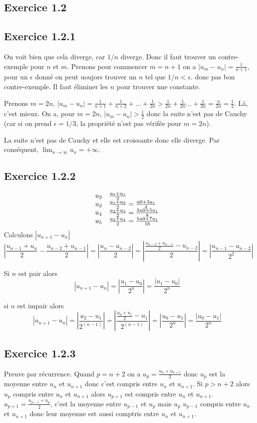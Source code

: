 \documentclass[]{book}
\theoremstyle{definition}
\begin{document}
\subsection*{Exercice 1.2}
\subsection*{Exercice 1.2.1}
On voit bien que cela diverge, car $1/n$ diverge. Donc il faut trouver un contre-exemple pour $n$ et $m$.
Prenons pour commencer $m=n+1$ on a $|u_m-u_n| = \frac{1}{n+1}$, pour un $\epsilon$ donn\'e on peut uoujors trouver un $n$ tel que $1/n < \epsilon$. donc pas bon contre-exemple. Il faut \'eliminer les $n$ pour trouver une constante.

Prenons $m=2n$, $|u_m-u_n| = \frac{1}{n+1} + \frac{1}{n+2} + \ldots + \frac{1}{2n} > \frac{1}{2n} + \frac{1}{2n} \ldots + \frac{1}{2n} = \frac{n}{2n} = \frac{1}{2}$. L\`a, c'est mieux. On a, pour $m=2n$, $|u_m-u_n| > \frac{1}{2}$ donc la suite n'est pas de Cauchy (car si on prend $\epsilon = 1/3$, la propri\'et\'e n'est pas v\'erif\'ee pour $m=2n$).

La suite n'est pas de Cauchy et elle est croissante donc elle diverge. Par cons\'equent, $\lim_{n \to \infty} u_n = +\infty$.

\subsection*{Exercice 1.2.2}
$$
\begin{array}{l l}
u_2 & \frac{u_0+u_1}{2} \\
u_3 & \frac{u_1+u_2}{2} = \frac{u0+3u_1}{4}\\
u_4 & \frac{u_2+u_3}{2} = \frac{3u0+5u_1}{8}\\
u_5 & \frac{u_3+u_4}{2} = \frac{5u0+7u_1}{16}\\
\end{array}
$$
Calculons $|u_{n+1} - u_{n}|$
$$
|\frac{u_{n-1}+u_{n}}{2} - \frac{u_{n-2}+u_{n-1}}{2}| = |\frac{u_{n}-u_{n-2}}{2}| = |\frac{\frac{u_{n-2}+u_{n-1}}{2}-u_{n-2}}{2}| = |\frac{u_{n-1}-u_{n-2}}{2^2}|
$$ 

Si $n$ est pair alors 
$$|u_{n+1} - u_{n}| = |\frac{u_1 - u_0}{2^n}| = \frac{|u_1 - u_0|}{2^n}$$ 

si $n$ est impair alors
$$|u_{n+1} - u_{n}| = |\frac{u_2 - u_1}{2^(n-1)}| = |\frac{\frac{u_0+u_1}{2} - u_1}{2^(n-1)}| = |\frac{u_0 - u_1}{2^n}| = \frac{|u_0 - u_1|}{2^n}$$

\subsection*{Exercice 1.2.3}
Preuve par r\'ecurrence. Quand $p=n+2$ on a $u_p = \frac{u_n+u_{n+1}}{2}$ donc $u_p$ est la moyenne entre $u_n$ et $u_{n+1}$ donc c'est compris entre $u_n$ et $u_{n+1}$. Si $p>n+2$ alors $u_p$ compris entre $u_{n}$ et $u_{n+1}$ alors $u_{p+1}$ est compris entre $u_{n}$ et $u_{n+1}$. $u_{p+1} = \frac{u_{p-1} + u_{p}}{2}$, c'est la moyenne entre $u_{p-1}$ et $u_{p}$ mais $u_p$ $u_{p-1}$ compris entre $u_{n}$ et $u_{n+1}$ donc leur moyenne est aussi comptris entre $u_{n}$ et $u_{n+1}$.
\end{document}
